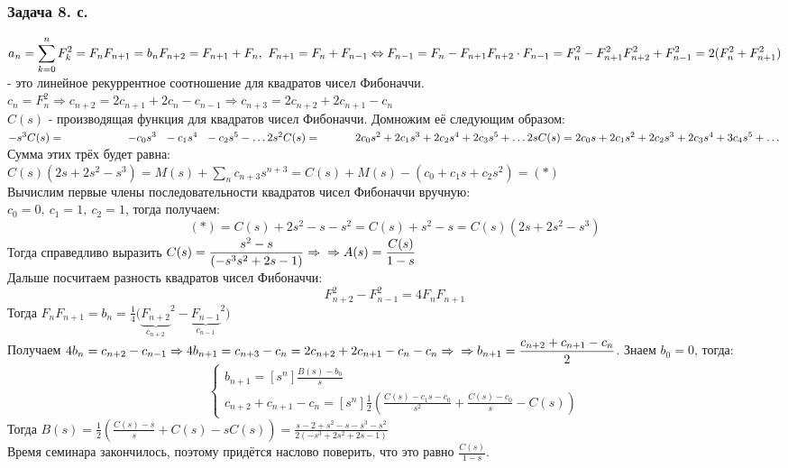 \documentclass[12pt, letterpaper, twoside]{article}
\begin{document}
\subsubsection*{Задача 8. с.}
$\displaystyle a_n = \sum_{k = 0}^{n} F^2_k = F_n F_{n + 1} = b_n\\
F_{n + 2} = F_{n + 1} + F_n,\ F_{n + 1} = F_n + F_{n - 1}\Leftrightarrow F_{n - 1} = F_{n} - F_{n + 1}\\
F_{n + 2}\cdot F_{n - 1} = F_n^2 - F_{n + 1}^2\\
F_{n + 2}^2 + F_{n -1}^2 = 2(F^2_n + F_{n + 1}^2)$ - это линейное рекуррентное соотношение для квадратов чисел Фибоначчи.\\
$c_n = F_n^2\Rightarrow c_{n + 2} = 2c_{n + 1} + 2c_n - c_{n - 1}\Rightarrow c_{n + 3} = 2c_{n + 2} + 2c_{n + 1} - c_n$\\
$C(s)$ - производящая функция для квадратов чисел Фибоначчи. Домножим её следующим образом:\\
$-s^3 C(s) = \hspace{2cm}-c_0 s^3\ \ - c_1s^4\ \ - c_2s^5 -\dots\\
2s^2 C(s) = \hspace{1.1cm}2c_0s^2 + 2c_1s^3 + 2c_2s^4 + 2c_3s^5 + \dots\\
2s C(s)=  2c_0 s + 2c_1 s^2 + 2c_2 s^3 + 2c_3 s^4 + 3c_4 s^5 + \dots$\\
Сумма этих трёх будет равна:\\
$C(s)(2s + 2s^2 - s^3) = M(s) + \displaystyle \sum_{n}c_{n + 3} s^{n + 3} = C(s) + M(s) - (c_0 + c_1s + c_2s^2) = (*)$\\
Вычислим первые члены последовательности квадратов чисел Фибоначчи вручную:\\
$c_0 = 0,\ c_1 = 1,\ c_2 = 1$, тогда получаем:
\[(*) = C(s) + 2s^2 - s - s^2 = C(s) + s^2 - s = C(s)(2s + 2s^2 - s^3)\]
Тогда справедливо выразить $C(s) = \dfrac{s^2 - s}{(-s^3 s^2 + 2s - 1)}\Rightarrow\\
\Rightarrow A(s) = \dfrac{C(s)}{1 - s}$\\
Дальше посчитаем разность квадратов чисел Фибоначчи:
\[F_{n + 2}^2 - F_{n - 1}^2 = 4F_{n}F_{n + 1}\]
Тогда $F_{n}F_{n + 1} = b_n = \frac{1}{4} \Big(\underset{c_{n + 2}}{\underbrace{F_{n + 2}}}^2 - \underset{c_{n - 1}}{\underbrace{F_{n - 1}}}^2\Big)$\\
Получаем $4b_n = c_{n + 2} - c_{n - 1}\Rightarrow 4b_{n + 1} = c_{n + 3} - c_n = 2c_{n + 2} + 2c_{n + 1} - c_n - c_n\Rightarrow\\
\Rightarrow \displaystyle b_{n + 1} = \frac{c_{n + 2} + c_{n + 1} - c_n}{2}$. Знаем $b_0 = 0$, тогда:\\
\[\begin{cases}b_{n + 1} = [s^n]\frac{B(s) - b_0}{s} \\
    c_{n + 2} + c_{n + 1} - c_n = [s^n]\frac{1}{2}\left(\frac{C(s) - c_1 s - c_0}{s^2} + \frac{C(s) - c_0}{s} - C(s)\right) \end{cases}\]
Тогда $B(s) = \frac{1}{2}\left( \frac{C(s) - s}{s} + C(s) - sC(s)\right) = \frac{s - 2 + s^2 - s - s^3 - s^2}{2(-s^3 + 2s^2 + 2s - 1)}$\\
Время семинара закончилось, поэтому придётся наслово поверить, что это равно $\frac{C(s)}{1 - s}$.
\end{document}
